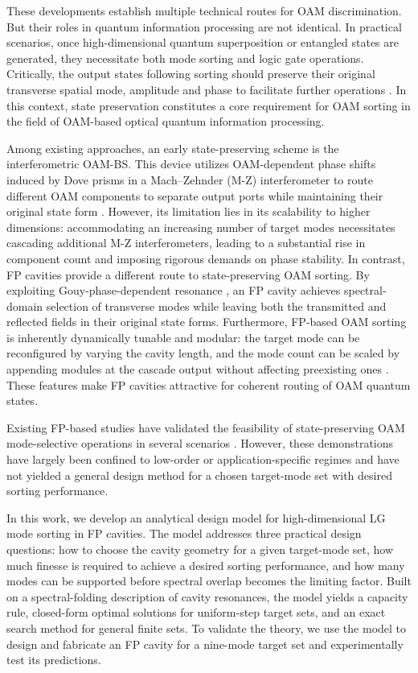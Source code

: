 \documentclass{optica-article}
\begin{document}
These developments establish multiple technical routes for OAM discrimination. But their roles in quantum information processing are not identical. In practical scenarios, once high-dimensional quantum superposition or entangled states are generated, they necessitate both mode sorting and logic gate operations. Critically, the output states following sorting should preserve their original transverse spatial mode, amplitude and phase to facilitate further operations \cite{Babazadeh2017_PRL,Brandt2020}. In this context, state preservation constitutes a core requirement for OAM sorting in the field of OAM-based optical quantum information processing.

Among existing approaches, an early state-preserving scheme is the interferometric OAM-BS. This device utilizes OAM-dependent phase shifts induced by Dove prisms in a Mach--Zehnder (M-Z) interferometer to route different OAM components to separate output ports while maintaining their original state form \cite{Leach2002,Slussarenko2010}. However, its limitation lies in its scalability to higher dimensions: accommodating an increasing number of target modes necessitates cascading additional M-Z interferometers, leading to a substantial rise in component count and imposing rigorous demands on phase stability. In contrast, FP cavities provide a different route to state-preserving OAM sorting. By exploiting Gouy-phase-dependent resonance \cite{Kogelnik1966,Siegman1986}, an FP cavity achieves spectral-domain selection of transverse modes while leaving both the transmitted and reflected fields in their original state forms. Furthermore, FP-based OAM sorting is inherently dynamically tunable and modular: the target mode can be reconfigured by varying the cavity length, and the mode count can be scaled by appending modules at the cascade output without affecting preexisting ones \cite{Wei2020_Light}. These features make FP cavities attractive for coherent routing of OAM quantum states.

Existing FP-based studies have validated the feasibility of state-preserving OAM mode-selective operations in several scenarios \cite{Wei2020_Light,Vanani2022,Yang2024_PRJ}. However, these demonstrations have largely been confined to low-order or application-specific regimes and have not yielded a general design method for a chosen target-mode set with desired sorting performance.

In this work, we develop an analytical design model for high-dimensional LG mode sorting in FP cavities. The model addresses three practical design questions: how to choose the cavity geometry for a given target-mode set, how much finesse is required to achieve a desired sorting performance, and how many modes can be supported before spectral overlap becomes the limiting factor. Built on a spectral-folding description of cavity resonances, the model yields a capacity rule, closed-form optimal solutions for uniform-step target sets, and an exact search method for general finite sets. To validate the theory, we use the model to design and fabricate an FP cavity for a nine-mode target set and experimentally test its predictions.
\end{document}
